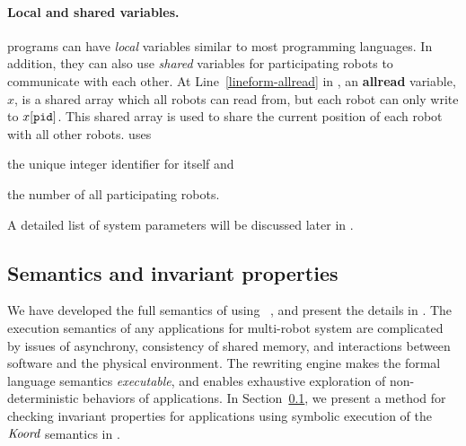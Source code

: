 \paragraph{Local and shared variables.}
 \lgname programs can have  \emph{local} variables similar to most programming languages.
%
%
In addition, they can also use \emph{shared} variables for participating robots to communicate with each other.
At Line~\ref{lineform-allread} in , an \textbf{allread} variable, $x$, is a shared array which all robots can read from,  but each robot \myuin can only write to $x[\texttt{pid}]$.  This shared array is used to share the current position of each robot with all other robots. 
\LineForm uses
\begin{inparaenum}[(a)]
    \item the unique integer identifier \myuin for itself and
    \item the number \NMAX of all participating robots.
\end{inparaenum}
A detailed list of system parameters will be discussed later in .






\subsection{Semantics and invariant properties}

We have developed the full semantics of \lgname using \K~\cite{rosu-serbanuta-2013-k}, and present the details in . The execution semantics of any applications for multi-robot system are complicated by issues of asynchrony, consistency of shared memory, and interactions between software and  the physical environment.
The \K rewriting engine makes the formal language semantics \emph{executable}, and enables exhaustive exploration of non-deterministic behaviors of \lgname applications.
In Section~\ref{}, we present a method for checking invariant properties for \lgname applications using symbolic execution of the $\emph{Koord}$ semantics in \K.

